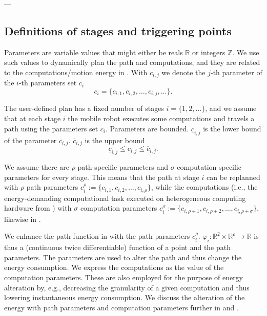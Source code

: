 ---

\subsection{Definitions of stages and triggering points}
\label{sec:defs-stages-triggs}



Parameters are variable values that might either be reals $\mathbb{R}$ or integers $\mathbb{Z}$. We use such values to dynamically plan the path and computations, and they are related to the computations/motion energy in . With  $c_{i,j}$ we denote the $j$-th parameter of the $i$-th parameters set $c_i$
\begin{equation}
  c_i=\{c_{i,1},c_{i,2},\dots,c_{i,j},\dots\}.
\end{equation}

The user-defined plan has a fixed number of stages $i=\{1,2,\dots\}$, and we assume that at each stage $i$ the mobile robot executes some computations and travels a path using the parameters set $c_i$. Parameters are bounded. $\underline{c}_{i,j}$ is the lower bound of the parameter $c_{i,j}$. $\overline{c}_{i,j}$ is the upper bound
\begin{equation}
  \underline{c}_{i,j}\leq c_{i,j}\leq\overline{c}_{i,j}.
\end{equation}

We assume there are $\rho$ path-specific parameters and $\sigma$ computation-specific parameters for every stage. This means that the path at stage $i$ can be replanned with $\rho$ path parameters
$c_i^\rho:=\{c_{i,1},c_{i,2},\dots,c_{i,\rho}\}$,
while the computations (i.e., the energy-demanding computational task executed on heterogeneous computing hardware from ) with $\sigma$ computation parameters 
$c_i^\sigma:=\{c_{i,\rho+1},c_{i,\rho+2},\dots,c_{i,\rho+\sigma}\}$, likewise in .

We enhance the path function in  with the path parameters $c_i^\rho$. $\varphi_i:\mathbb{R}^2\times\mathbb{R}^\rho\rightarrow\mathbb{R}$ is thus a (continuous twice differentiable) function of a point and the path parameters. The parameters are used to alter the path and thus change the energy consumption. 
We express the computations as the value of the computation parameters. These are also employed for the purpose of energy alteration by, e.g., decreasing the granularity of a given computation and thus lowering instantaneous energy consumption. We discuss the alteration of the energy with path parameters and computation parameters further in  and .

